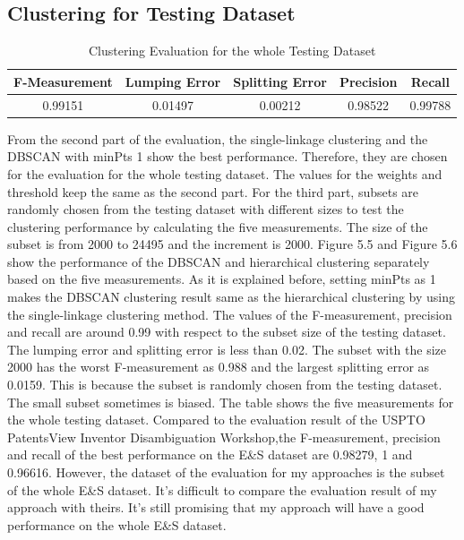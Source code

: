 \subsection{Clustering for Testing Dataset}
\begin{table}
\centering
\begin{tabular}{|c|c|c|c|c|}
\hline
F-Measurement&Lumping Error&Splitting Error&Precision&Recall\\
\hline
0.99151&0.01497&0.00212&0.98522&0.99788\\
\hline
\end{tabular}
\caption{Clustering Evaluation for the whole Testing Dataset}
\end{table}

From the second part of the evaluation, the single-linkage clustering and the DBSCAN with minPts 1 show the best performance. Therefore, they are chosen for the evaluation for the whole testing dataset. The values for the weights and threshold keep the same as the second part. For the third part, subsets are randomly chosen from the testing dataset with different sizes to test the clustering performance by calculating the five measurements. The size of the subset is from 2000 to 24495 and the increment is 2000. Figure 5.5 and Figure 5.6 show the performance of the DBSCAN and hierarchical clustering separately based on the five measurements. As it is explained before, setting minPts as 1 makes the DBSCAN clustering result same as the hierarchical clustering by using the single-linkage clustering method. The values of the F-measurement, precision and recall are around 0.99 with respect to the subset size of the testing dataset. The lumping error and splitting error is less than 0.02. The subset with the size 2000 has the worst F-measurement as 0.988 and the largest splitting error as 0.0159. This is because the subset is randomly chosen from the testing dataset. The small subset sometimes is biased. The table shows the five measurements for the whole testing dataset. Compared to the evaluation result of the USPTO PatentsView Inventor Disambiguation Workshop,the F-measurement,  precision and recall of the best performance on the E\&S dataset are 0.98279, 1 and 0.96616. However, the dataset of the evaluation for my approaches is the subset of the whole E\&S dataset. It's difficult to compare the evaluation result of my approach with theirs. It's still promising that my approach will have a good performance on the whole E\&S dataset.

